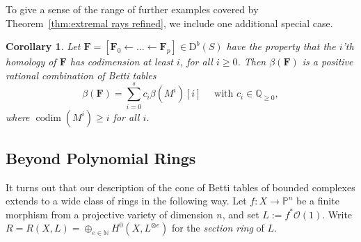 \documentclass[12pt]{amsart}
\newtheorem{cor}[lemma]{Corollary}
\theoremstyle{definition}
\newtheorem{example}[lemma]{Example}
\theoremstyle{remark}
\newcommand{\kk}{\Bbbk}
\newcommand{\codim}{\operatorname{codim}}
\newcommand{\PP}{\mathbb{P}}
\newcommand{\QQ}{\mathbb{Q}}
\newcommand{\cO}{\mathcal{O}}
\newcommand{\FF}{\mathbf{F}}
\newcommand{\zp}{\circ}
\newcommand{\DD}{\mathrm{D}}
\begin{document}
To give a sense of the range of further examples covered by Theorem~\ref{thm:extremal rays refined}, we include one additional special case.

\begin{cor}\label{cor:decompose2}
Let $\FF=[\FF_0\gets \dots \gets \FF_p]\in \DD^b(S)$ have the property that the $i$'th homology of $\FF$ has codimension at least $i$, for all $i\geq 0$.  Then $\beta(\FF)$ is a positive rational combination of Betti tables
\[\beta(\FF)=\sum_{i=0}^s c_i\beta(M^i)[i] \quad \text{ with } c_i\in \QQ_{\geq 0},\]
where $\codim(M^i)\geq i$ for all $i$. 
\end{cor}
%
%
\subsection*{Beyond Polynomial Rings}
It turns out that our description of the cone of Betti tables of bounded complexes
extends to a wide class of rings in the following way. Let $f:X\to \PP^{n}$ be a finite
morphism from a projective variety of dimension $n$, and set $L:=f^*\cO(1)$. 
Write $R=R(X,L)=\oplus_{e\in \mathbb N} H^0(X,L^{\otimes e})$ for the \emph{section ring}
of $L$.
\end{document}
